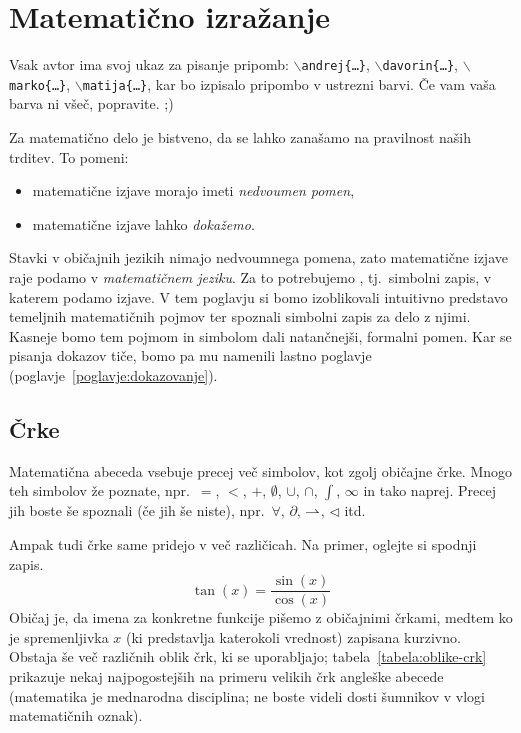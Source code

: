 \chapter{Matematično izražanje}\label{poglavje:matematicno-izrazanje}


\alert{Vsak avtor ima svoj ukaz za pisanje pripomb: \textcolor{andrejcolor}{\texttt{$\backslash$andrej\{\ldots\}}}, \textcolor{davorincolor}{\texttt{$\backslash$davorin\{\ldots\}}}, \textcolor{markocolor}{\texttt{$\backslash$marko\{\ldots\}}}, \textcolor{matijacolor}{\texttt{$\backslash$matija\{\ldots\}}}, kar bo izpisalo pripombo v ustrezni barvi. Če vam vaša barva ni všeč, popravite. ;)}


Za matematično delo je bistveno, da se lahko zanašamo na pravilnost naših trditev. To pomeni:
\begin{itemize}
\item
matematične izjave morajo imeti \emph{nedvoumen pomen},
\item
matematične izjave lahko \emph{dokažemo}.
\end{itemize}

Stavki v običajnih jezikih nimajo nedvoumnega pomena, zato matematične izjave raje podamo v \emph{matematičnem jeziku}. Za to potrebujemo , tj.~simbolni zapis, v katerem podamo izjave. V tem poglavju si bomo izoblikovali intuitivno predstavo temeljnih matematičnih pojmov ter spoznali simbolni zapis za delo z njimi. Kasneje bomo tem pojmom in simbolom dali natančnejši, formalni pomen. Kar se pisanja dokazov tiče, bomo pa mu namenili lastno poglavje (poglavje~\ref{poglavje:dokazovanje}).


\section{Črke}

Matematična abeceda vsebuje precej več simbolov, kot zgolj običajne črke. Mnogo teh simbolov že poznate, npr.~$=$, $<$, $+$, $\emptyset$, $\cup$, $\cap$, $\int$, $\infty$ in tako naprej. Precej jih boste še spoznali (če jih še niste), npr.~$\forall$, $\partial$, $\mathrel{\rightharpoonup}$, $\lhd$ itd.

Ampak tudi črke same pridejo v več različicah. Na primer, oglejte si spodnji zapis.
\[\tan(x) = \frac{\sin(x)}{\cos(x)}\]
Običaj je, da imena za konkretne funkcije pišemo z običajnimi črkami, medtem ko je spremenljivka $x$ (ki predstavlja katerokoli vrednost) zapisana kurzivno. Obstaja še več različnih oblik črk, ki se uporabljajo; tabela~\ref{tabela:oblike-crk} prikazuje nekaj najpogostejših na primeru velikih črk angleške abecede (matematika je mednarodna disciplina; ne boste videli dosti šumnikov v vlogi matematičnih oznak).

